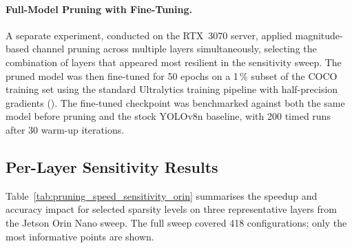 \documentclass[12pt,a4paper]{report}
\begin{document}
\paragraph{Full-Model Pruning with Fine-Tuning.}
A separate experiment, conducted on the RTX~3070 server, applied magnitude-based channel
pruning across multiple layers simultaneously, selecting the combination of layers that
appeared most resilient in the sensitivity sweep. The pruned model was then fine-tuned for
50 epochs on a 1\,\% subset of the COCO training set using the standard Ultralytics
training pipeline with half-precision gradients (). The fine-tuned
checkpoint was benchmarked against both the same model before pruning and the stock
YOLOv8n baseline, with 200 timed runs after 30 warm-up iterations.

\subsection{Per-Layer Sensitivity Results}

Table~\ref{tab:pruning_speed_sensitivity_orin} summarises the speedup and accuracy impact
for selected sparsity levels on three representative layers from the Jetson Orin Nano sweep.
The full sweep covered 418 configurations; only the most informative points are shown.
\end{document}
